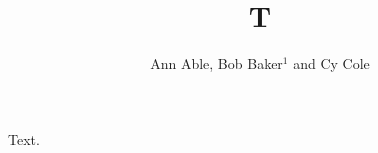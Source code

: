 \documentclass{iopart}
\begin{document}
\title{T}
\author{Ann Able, Bob Baker$^1$ and Cy Cole}
\address{Univ A, Town A \\

$^1$Univ B, Town B}
Text.
\end{document}
